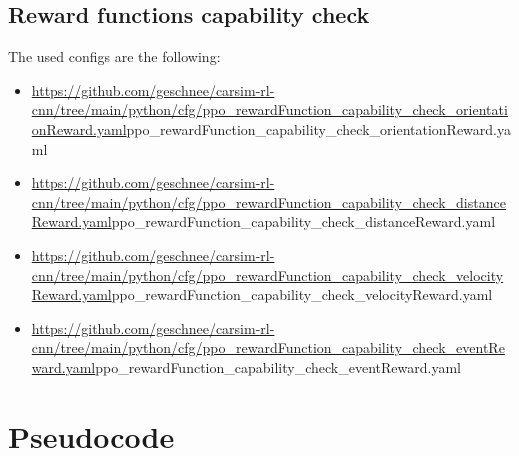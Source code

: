 \subsection{Reward functions capability check}
The used configs are the following:
\begin{itemize}
    \item \url{https://github.com/geschnee/carsim-rl-cnn/tree/main/python/cfg/ppo_rewardFunction_capability_check_orientationReward.yaml}{ppo\_rewardFunction\_capability\_check\_orientationReward.yaml}
    \item \url{https://github.com/geschnee/carsim-rl-cnn/tree/main/python/cfg/ppo_rewardFunction_capability_check_distanceReward.yaml}{ppo\_rewardFunction\_capability\_check\_distanceReward.yaml}
    \item \url{https://github.com/geschnee/carsim-rl-cnn/tree/main/python/cfg/ppo_rewardFunction_capability_check_velocityReward.yaml}{ppo\_rewardFunction\_capability\_check\_velocityReward.yaml}
    \item \url{https://github.com/geschnee/carsim-rl-cnn/tree/main/python/cfg/ppo_rewardFunction_capability_check_eventReward.yaml}{ppo\_rewardFunction\_capability\_check\_eventReward.yaml}
\end{itemize}



\section{Pseudocode}

